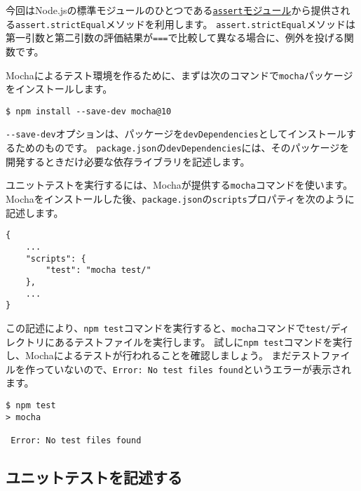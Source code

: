 今回はNode.jsの標準モジュールのひとつである\href{https://nodejs.org/api/assert.html}{\texttt{assert}モジュール}から提供される\texttt{assert.strictEqual}メソッドを利用します。
\texttt{assert.strictEqual}メソッドは第一引数と第二引数の評価結果が\texttt{===}で比較して異なる場合に、例外を投げる関数です。

Mochaによるテスト環境を作るために、まずは次のコマンドで\texttt{mocha}パッケージをインストールします。

\begin{lstlisting}
$ npm install --save-dev mocha@10
\end{lstlisting}

\texttt{-\/-save-dev}オプションは、パッケージを\texttt{devDependencies}としてインストールするためのものです。
\texttt{package.json}の\texttt{devDependencies}には、そのパッケージを開発するときだけ必要な依存ライブラリを記述します。

ユニットテストを実行するには、Mochaが提供する\texttt{mocha}コマンドを使います。
Mochaをインストールした後、\texttt{package.json}の\texttt{scripts}プロパティを次のように記述します。\enlargethispage{\baselineskip}

\begin{lstlisting}
{
    ...
    "scripts": {
        "test": "mocha test/"
    },
    ...
}
\end{lstlisting}

この記述により、\texttt{npm test}コマンドを実行すると、\texttt{mocha}コマンドで\texttt{test/}ディレクトリにあるテストファイルを実行します。
試しに\texttt{npm test}コマンドを実行し、Mochaによるテストが行われることを確認しましょう。
まだテストファイルを作っていないので、\texttt{Error: No test files found}というエラーが表示されます。

\begin{lstlisting}
$ npm test
> mocha

 Error: No test files found
\end{lstlisting}

\hypertarget{write-unit-test}{%
\subsection{ユニットテストを記述する}\label{write-unit-test}}

